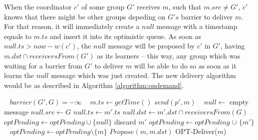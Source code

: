 \documentclass[times, 10pt]{article}
\begin{document}
When the coordinator $c'$ of some group $G'$ receives $m$, such that $m.src \neq G'$, $c'$ knows that there might be other groups depeding on $G's$ barrier to deliver $m$. For that reason, it will immediately create a $null$ message with a timestamp equals to $m.ts$ and insert it into its optimistic queue. As soon as $null.ts > now - w(c')$, the $null$ message will be proposed by $c'$ in $G'$, having \mbox{$m.dst \cap receiversFrom(G')$} as its learners -- this way, any group which was waiting for a barrier from $G'$ to deliver $m$ will be able to do so as soon as it learns the $null$ message which was just created. The new delivery algorithm would be as described in Algorithm {\ref{algorithm:ondemand}}.

\begin{algorithm}
\begin{distribalgo}[1]
\blankline\
    \STATE $barrier(G',G) = -\infty$
  \ENDINDENT
\ENDINDENT
\blankline\
  \STATE $m.ts \leftarrow getTime()$  
   \label{algline:askclearance}
    \STATE $send(p', m)$
  \ENDINDENT
\ENDINDENT
\blankline\
   \label{algline:askedforclearance}
    \STATE $null \leftarrow$ empty message
    \STATE $null.src \leftarrow G$
    \STATE $null.ts \leftarrow m'.ts$
    \STATE $null.dst \leftarrow m'.dst \cap receiversFrom(G)$
    \STATE $optPending \leftarrow optPending \cup \{null\}$
  \ENDIF
  \IF {$m'.ts < getTime() - w(p) \vee G \notin m'.dst$}
    \STATE discard $m'$
  \ELSE
    \STATE $optPending \leftarrow optPending$ $\cup$ $\{m'\}$
  \ENDIF
\ENDINDENT
\blankline\
  \STATE $optPending \leftarrow optPending \setminus \{m\}$
    \STATE $Propose(m, m.dst)$ %
  \ENDIF
  \IF {$m \neq null$}  %
    \STATE OPT-Deliver($m$)  

\end{distribalgo}
\end{algorithm}
\end{document}
